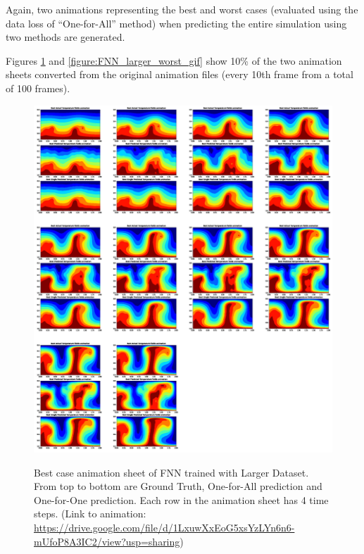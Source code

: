 Again, two animations representing the best and worst cases (evaluated using the data loss of ``One-for-All'' method) when predicting the entire simulation using two methods are generated.

Figures \ref{figure:FNN_larger_best_gif} and \ref{figure:FNN_larger_worst_gif} show 10\% of the two animation sheets converted from the original animation files (every 10th frame from a total of 100 frames).

\begin{figure}[H]
    \centering
    \caption{Best case animation sheet of FNN trained with Larger Dataset. From top to bottom are Ground Truth, One-for-All prediction and One-for-One prediction. Each row in the animation sheet has 4 time steps. (Link to animation: \url{https://drive.google.com/file/d/1LxuwXxEoG5xsYzLYn6n6-mUfoP8A3IC2/view?usp=sharing})}
    \includegraphics[scale=0.23]{figures/mantle_convection_images/larger_dataset/FNN_Best_GIF_sheet.png}
    \label{figure:FNN_larger_best_gif}
\end{figure}

